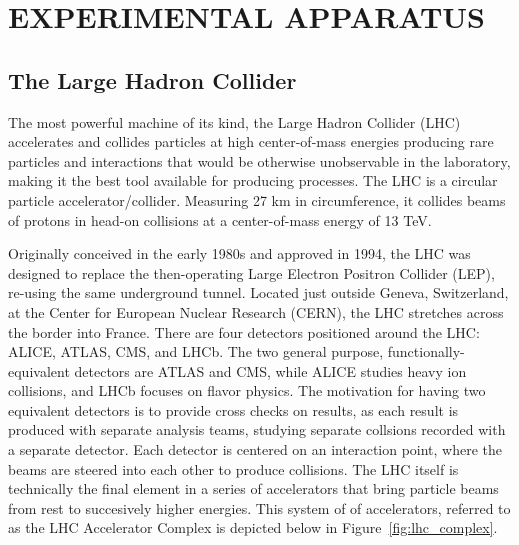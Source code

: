 %
%

\chapter{EXPERIMENTAL APPARATUS}
\label{chap:detector}

\section{The Large Hadron Collider}
\label{sec:lhc}
The most powerful machine of its kind, the Large Hadron
Collider (LHC) accelerates and collides particles
at high center-of-mass energies producing rare
particles and interactions that would be otherwise unobservable
in the laboratory, making it the best tool available for producing \tth
processes. The LHC is a circular particle accelerator/collider. Measuring 27 km
in circumference, it collides beams of protons in head-on collisions       
at a center-of-mass energy of 13 TeV.

Originally conceived in the early 1980s and approved in 1994, the LHC was designed to replace the then-operating
Large Electron Positron Collider (LEP), re-using the same underground tunnel. Located just outside Geneva, Switzerland, at the Center for European Nuclear Research (CERN),
the LHC stretches across the border into France. There are four detectors positioned around the LHC: ALICE, ATLAS, CMS, and LHCb. The two general purpose,
functionally-equivalent detectors are ATLAS and CMS, while ALICE studies heavy ion collisions, and LHCb focuses on flavor physics. 
The motivation for having two equivalent detectors is to provide cross checks on results, as each result is produced with separate analysis teams, studying separate collsions
recorded with a separate detector. Each detector is centered on an interaction point, where the beams are steered into each other to produce collisions. 
The LHC itself is technically the final element in a series of accelerators
that bring particle beams from rest to succesively higher energies. This system of
of accelerators, referred to as the LHC Accelerator Complex is depicted below in
Figure~\ref{fig:lhc_complex}.

